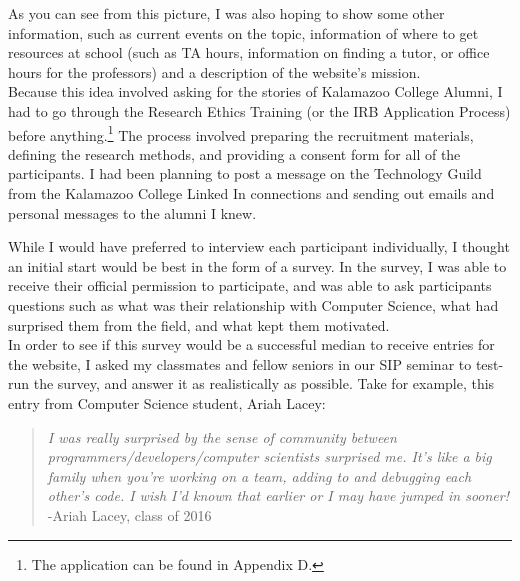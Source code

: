\documentclass[12pt]{article}
\begin{document}
    
    As you can see from this picture, I was also hoping to show some other information, such as current events on the topic, information of where to get resources at school (such as TA hours, information on finding a tutor, or office hours for the professors) and a description of the website's mission.\\
    
	Because this idea involved asking for the stories of Kalamazoo College Alumni, I had to go through the Research Ethics Training (or the IRB Application Process) before anything.\footnote{The application can be found in Appendix D.} The process involved preparing the recruitment materials, defining the research methods, and providing a consent form for all of the participants. I had been planning to post a message on the Technology Guild from the Kalamazoo College Linked In connections and sending out emails and personal messages to the alumni I knew. \\
	
		
		\pagebreak
		
	While I would have preferred to interview each participant individually, I thought an initial start would be best in the form of a survey. In the survey, I was able to receive their official permission to participate, and was able to ask participants questions such as what was their relationship with Computer Science, what had surprised them from the field, and what kept them motivated. \\

	In order to see if this survey would be a successful median to receive entries for the website, I asked my classmates and fellow seniors in our SIP seminar to test-run the survey, and answer it as realistically as possible. Take for example, this entry from Computer Science student, Ariah Lacey:
	
	\begin{quotation}
		\begin{center}
			\singlespacing
			\textit{I was really surprised by the sense of community between programmers/developers/computer scientists surprised me. It's like a big family when you're working on a team, adding to and debugging each other's code. I wish I'd known that earlier or I may have jumped in sooner!}\\
			-Ariah Lacey, class of 2016
		\end{center}
			
	\end{quotation}
\end{document}

